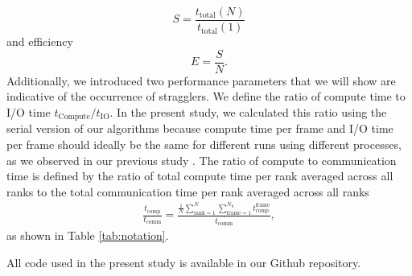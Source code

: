 \begin{equation}
  \label{eq:speedup}
  S = \frac{t_{\text{total}}(N)}{t_{\text{total}}(1)}
\end{equation}
and efficiency
\begin{equation}
  \label{eq:efficiency}
  E = \frac{S}{N}.
\end{equation}
Additionally, we introduced two performance parameters that we will show are indicative of the occurrence of stragglers.
We define the ratio of compute time to I/O time $t_{\text{Compute}}/t_{\text{IO}}$. 
In the present study, we calculated this ratio using the serial version of our algorithms because compute time per frame and I/O time per frame should ideally be the same for different runs using different processes, as we observed in our previous study \cite{Khoshlessan:2017ab}.
The ratio of compute to communication time is defined by the ratio of total compute time per rank averaged across all ranks to the total communication time per rank averaged across all ranks 
\begin{gather}
  \label{eq:Compute-comm}
  \frac{t_{\text{comp}}}{t_{\text{comm}}} = \frac{\frac{1}{N}
    \sum_{\text{rank}=1}^{N} \sum_{\text{frame}=1}^{N_{\text{b}}}t_{\text{comp}}^{\text{frame}}}%
  {\overline{t_{\text{comm}}}},
\end{gather}
as shown in Table \ref{tab:notation}.
 
All code used in the present study is available in our Github repository. 
 
